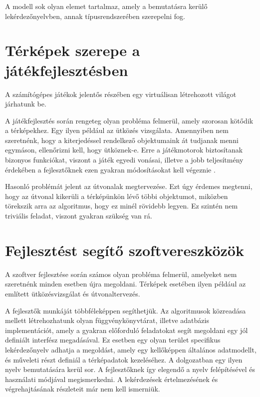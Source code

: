 A modell sok olyan elemet tartalmaz, amely a bemutatásra kerülő lekérdezőnyelvben, annak típusrendszerében szerepelni fog.


\section{Térképek szerepe a játékfejlesztésben}

A számítógépes játékok jelentős részében egy virtuálisan létrehozott világot járhatunk be.

A játékfejlesztés során rengeteg olyan probléma felmerül, amely szorosan kötődik a térképekhez. Egy ilyen például az ütközés vizsgálata. Amennyiben nem szeretnénk, hogy a kiterjedéssel rendelkező objektumaink át tudjanak menni egymáson, ellenőrizni kell, hogy ütköznek-e. Erre a játékmotorok biztosítanak bizonyos funkciókat, viszont a játék egyedi vonásai, illetve a jobb teljesítmény érdekében a fejlesztőknek ezen gyakran módosításokat kell végeznie \cite{GD09}.

Hasonló problémát jelent az útvonalak megtervezése. Ezt úgy érdemes megtenni, hogy az útvonal kikerüli a térképünkön lévő többi objektumot, miközben törekszik arra az algoritmus, hogy ez minél rövidebb legyen. Ez szintén nem triviális feladat, viszont gyakran szükség van rá.

\section{Fejlesztést segítő szoftvereszközök}

A szoftver fejlesztése során számos olyan probléma felmerül, amelyeket nem szeretnénk minden esetben újra megoldani. Térképek esetében ilyen például az említett ütközésvizsgálat és útvonaltervezés.

A fejlesztők munkáját többféleképpen segíthetjük. Az algoritmusok közreadása mellett létrehozhatunk olyan függvénykönyvtárat, illetve adatbázis implementációt, amely a gyakran előforduló feladatokat segít megoldani egy jól definiált interfész megadásával. Ez esetben egy olyan terület specifikus lekérdezőnyelv adhatja a megoldást, amely egy kellőképpen általános adatmodellt, és műveleti részt definiál a térképadatok kezeléséhez. A dolgozatban egy ilyen nyelv bemutatására kerül sor. A fejlesztőknek így elegendő a nyelv felépítésével és használati módjával megismerkedni. A lekérdezések értelmezésének és végrehajtásának részleteit már nem kell ismerniük.
